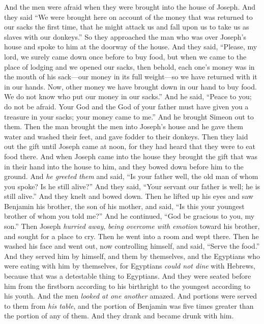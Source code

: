 \begin{biblechapter}
\verse And the men were afraid when they were brought into the house of Joseph. And they said “We were brought here on account of the money that was returned to our sacks the first time, that he might attack us and fall upon us to take us as slaves with our donkeys.”
\verse So they approached the man who was over Joseph’s house and spoke to him at the doorway of the house.
\verse And they said, “Please, my lord, we surely came down once before to buy food,
\verse but when we came to the place of lodging and we opened our sacks, then behold, each one’s money was in the mouth of his sack—our money in its full weight—so we have returned with it in our hands.
\verse Now, other money we have brought down in our hand to buy food. We do not know who put our money in our sacks.”
\verse And he said, “Peace to you; do not be afraid. Your God and the God of your father must have given you a treasure in your sacks; your money came to me.” And he brought Simeon out to them.
\verse Then the man brought the men into Joseph’s house and he gave them water and washed their feet, and gave fodder to their donkeys.
\verse Then they laid out the gift until Joseph came at noon, for they had heard that they were to eat food there.
\verse And when Joseph came into the house they brought the gift that was in their hand into the house to him, and they bowed down before him to the ground.
\verse And \textit{he greeted them} and said, “Is your father well, the old man of whom you spoke? Is he still alive?”
\verse And they said, “Your servant our father is well; he is still alive.” And they knelt and bowed down.
\verse Then he lifted up his eyes and saw Benjamin his brother, the son of his mother, and said, “Is this your youngest brother of whom you told me?” And he continued, “God be gracious to you, my son.”
\verse Then Joseph \textit{hurried away}, \textit{being overcome with emotion} toward his brother, and sought for a place to cry. Then he went into a room and wept there.
\verse Then he washed his face and went out, now controlling himself, and said, “Serve the food.”
\verse And they served him by himself, and them by themselves, and the Egyptians who were eating with him by themselves, for Egyptians \textit{could not dine} with Hebrews, because that was a detestable thing to Egyptians.
\verse And they were seated before him from the firstborn according to his birthright to the youngest according to his youth. And the men \textit{looked at one another} amazed.
\verse And portions were served to them from \textit{his table}, and the portion of Benjamin was five times greater than the portion of any of them. And they drank and became drunk with him.
\end{biblechapter}

